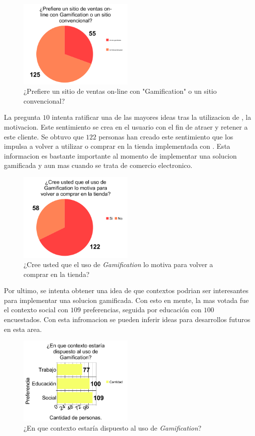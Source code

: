 \begin{figure}[!htb]
  \centering
  \includegraphics[width=0.5\textwidth]{images/chartPreg9.png}
  \caption[chart9]{¿Prefiere un sitio de ventas on-line con "Gamification" o un sitio convencional?}
  \label{fig:chart2}
\end{figure}

La pregunta $10$ intenta ratificar una de las mayores ideas tras la utilizacion de {\GAM},
la motivacion. Este sentimiento se crea en el usuario con el fin de atraer y retener a este cliente.
 Se obtuvo que $122$ personas han creado este sentimiento que los impulsa a volver a utilizar o comprar 
en la tienda implementada con {\GAM}. Esta informacion es bastante importante al momento de implementar
una solucion gamificada y aun mas cuando se trata de comercio electronico.

\begin{figure}[!htb]
  \centering
  \includegraphics[width=0.5\textwidth]{images/chartPreg10.png}
  \caption[chart10]{¿Cree usted que el uso de \emph{Gamification} lo motiva para volver a comprar en la tienda?}
  \label{fig:chart2}
\end{figure}

Por ultimo, se intenta obtener una idea de que contextos podrian ser interesantes para implementar una
solucion gamificada. Con esto en mente, la mas votada fue el contexto social con $109$ preferencias, 
seguida por educación con $100$ encuestados. Con esta infromacion se pueden inferir ideas para 
desarrollos futuros en esta area.

\begin{figure}[!htb]
  \centering
  \includegraphics[width=0.5\textwidth]{images/chartPreg11.png}
  \caption[chart11]{¿En que contexto estaría dispuesto al uso de \emph{Gamification}?}
  \label{fig:chart2}
\end{figure}
